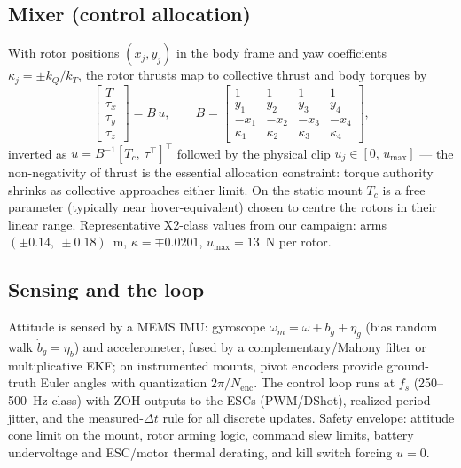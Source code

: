 \documentclass[conference]{IEEEtran}
\begin{document}
\subsection{Mixer (control allocation)}
With rotor positions $(x_j, y_j)$ in the body frame and yaw coefficients $\kappa_j = \pm k_Q/k_T$, the rotor thrusts map to collective thrust and body torques by
\begin{equation}
\begin{bmatrix} T\\ \tau_x\\ \tau_y\\ \tau_z\end{bmatrix}
= B\,u,\qquad
B = \begin{bmatrix}
1&1&1&1\\
y_1&y_2&y_3&y_4\\
-x_1&-x_2&-x_3&-x_4\\
\kappa_1&\kappa_2&\kappa_3&\kappa_4
\end{bmatrix},
\label{eq:mixer}
\end{equation}
inverted as $u = B^{-1}[T_c,\ \tau^{\!\top}]^{\!\top}$ followed by the physical clip $u_j\in[0,\,u_{\max}]$ --- the non-negativity of thrust is the essential allocation constraint: torque authority shrinks as collective approaches either limit. On the static mount $T_c$ is a free parameter (typically near hover-equivalent) chosen to centre the rotors in their linear range. Representative X2-class values from our campaign: arms $(\pm0.14,\ \pm0.18)$~m, $\kappa = \mp0.0201$, $u_{\max} = 13$~N per rotor.

\subsection{Sensing and the loop}
Attitude is sensed by a MEMS IMU: gyroscope $\omega_m = \omega + b_g + \eta_g$ (bias random walk $\dot b_g = \eta_b$) and accelerometer, fused by a complementary/Mahony filter or multiplicative EKF; on instrumented mounts, pivot encoders provide ground-truth Euler angles with quantization $2\pi/N_{\mathrm{enc}}$. The control loop runs at $f_s$ (250--500~Hz class) with ZOH outputs to the ESCs (PWM/DShot), realized-period jitter, and the measured-$\Delta t$ rule for all discrete updates. Safety envelope: attitude cone limit on the mount, rotor arming logic, command slew limits, battery undervoltage and ESC/motor thermal derating, and kill switch forcing $u = 0$.

\end{document}
